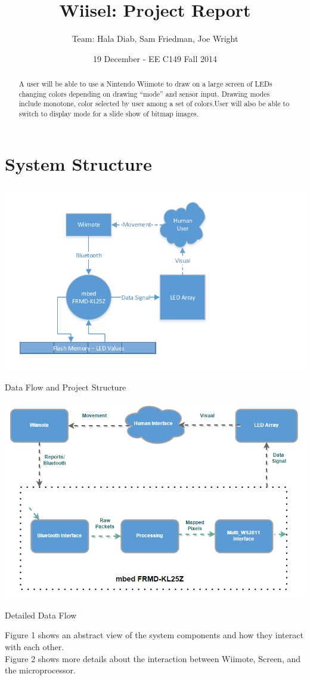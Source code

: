 \documentclass{tufte-handout}
\title{Wiisel: Project Report}
\author{Team: Hala Diab, Sam Friedman, Joe Wright}
\date{19 December - EE C149 Fall 2014}
\begin{document}
\maketitle
\begin{abstract}
    A user will be able to use a Nintendo Wiimote to draw on a large screen of
LEDs changing colors depending
on drawing ``mode'' and sensor input. Drawing modes include monotone, color selected by user among a set of colors.User will also be able to switch to display mode for a slide show of bitmap images.
\end{abstract}

\section{\textbf{System Structure}}

\begin{marginfigure}
    \includegraphics[trim=1cm 0cm 4cm 0cm, width=\linewidth]{dataflow.pdf}
    \caption{Data Flow and Project Structure}
\end{marginfigure}
\begin{marginfigure}
    \includegraphics[trim=3cm 0cm 4cm 0cm, width=\linewidth]{dataflow1.png}
    \caption{Detailed Data Flow}
\end{marginfigure}
Figure 1 shows an abstract view of the system components and how they interact with each other.\\Figure 2 shows more details about the interaction between Wiimote, Screen, and the microprocessor.
\end{document}
